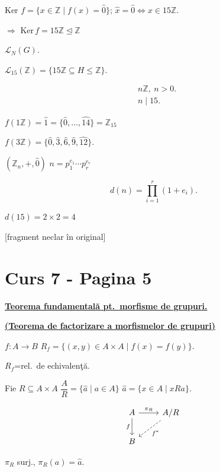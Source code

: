\bigskip
\noindent Ker $f = \{x\in\mathbb{Z} \mid f(x)=\hat 0\}$; \quad $\hat x=\hat 0 \Leftrightarrow x\in 15\mathbb{Z}$.

\noindent $\Rightarrow$ Ker$\,f = 15\mathbb{Z} \trianglelefteq \mathbb{Z}$

\bigskip
\noindent $\mathcal{L}_N(G)$.

\noindent $\mathcal{L}_{15}(\mathbb{Z}) = \{15\mathbb{Z}\subseteq H\leq \mathbb{Z}\}$.

\[
\begin{aligned}
&n\mathbb{Z}, \ n>0.\\
&n\mid 15.
\end{aligned}
\]

\bigskip
\noindent $f(1\mathbb{Z}) = \hat 1 = \{\hat 0,\ldots,\hat{14}\} = \mathbb{Z}_{15}$

\noindent $f(3\mathbb{Z}) = \{\hat 0,\hat 3,\hat 6,\hat 9,\hat{12}\}$.

\bigskip
\noindent $(\mathbb{Z}_n,+,\hat 0)$ \quad $n=p_1^{e_1}\cdots p_r^{e_r}$

\[
d(n) = \prod_{i=1}^{r}(1+e_i).
\]

\noindent $d(15) = 2\times 2 = 4$

\noindent \footnotesize [fragment neclar în original]\normalsize



\section*{Curs 7 - Pagina 5}

\noindent\underline{\textbf{Teorema fundamentală pt.\ morfisme de grupuri.}}

\noindent\underline{\textbf{(Teorema de factorizare a morfismelor de grupuri)}}

\bigskip
\noindent $f:A\to B$ \qquad $R_f = \{(x,y)\in A\times A \mid f(x)=f(y)\}$.

\noindent $R_f$=rel.\ de echivalenţă.

\bigskip
\noindent Fie $R\subseteq A\times A$ \qquad $\dfrac{A}{R} = \{\hat a \mid a\in A\}$ \qquad $\hat a = \{x\in A \mid xRa\}$.

\[
\begin{tikzcd}
A \arrow[r,"\pi_R"] \arrow[d,"f"'] & A/R \arrow[dl, dashed,"f^*"] \\
B &
\end{tikzcd}
\]

\noindent $\pi_R$ surj., \quad $\pi_R(a) = \hat a$.

